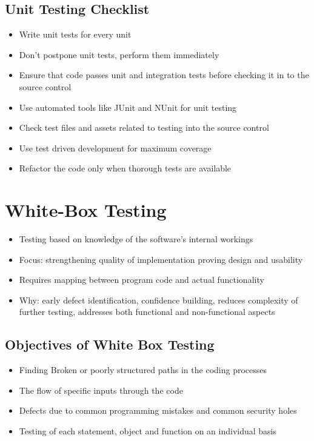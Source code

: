 \documentclass{article}
\begin{document}
\subsection{Unit Testing Checklist}
\begin{itemize}
    \item Write unit tests for every unit
    
    \item Don't postpone unit tests, perform them immediately
    
    \item Ensure that code passes unit and integration tests before checking it in to the source control
    
    \item Use automated tools like JUnit and NUnit for unit testing
    
    \item Check test files and assets related to testing into the source control
    
    \item Use test driven development for maximum coverage
    
    \item Refactor the code only when thorough tests are available
\end{itemize}

\section{White-Box Testing}
\begin{itemize}
    \item Testing based on knowledge of the software's internal workings
    
    \item Focus: strengthening quality of implementation proving design and usability
    
    \item Requires mapping between program code and actual functionality
    
    \item Why: early defect identification, confidence building, reduces complexity of further testing, addresses both functional and non-functional aspects
\end{itemize}
\subsection{Objectives of White Box Testing}
\begin{itemize}
    \item Finding Broken or poorly structured paths in the coding processes
    \item The flow of specific inputs through the code
    \item Defects due to common programming mistakes and common security holes
    \item Testing of each statement, object and function on an individual basis
\end{itemize}
\end{document}

